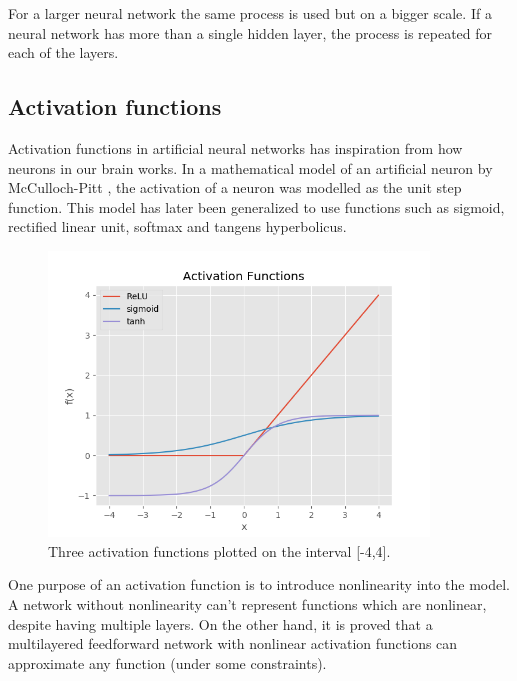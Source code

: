 For a larger neural network the same process is used but on a bigger scale. If a neural network has more than a single hidden layer, the process is repeated for each of the layers.




\subsection{Activation functions} %
\label{activation_functions}

Activation functions in artificial neural networks has inspiration from how neurons in our brain works. In a mathematical model of an artificial neuron by McCulloch-Pitt \cite{mcculloch_logical_1943}, the activation of a neuron was modelled as the unit step function. This model has later been generalized to use functions such as sigmoid, rectified linear unit, softmax and tangens hyperbolicus. \parencite{jain_artificial_1996}

\begin{figure}[H]
  \centering
    \includegraphics[width=0.9\textwidth]{Assets/Chapter2_Theory/activation_function_overview.png}
    \caption{Three activation functions plotted on the interval [-4,4].}
\end{figure}

One purpose of an activation function is to introduce nonlinearity into the model. A network without nonlinearity can't represent functions which are nonlinear, despite having multiple layers. On the other hand, it is proved that a multilayered feedforward network with nonlinear activation functions can approximate any function (under some constraints). \cite{leshno_multilayer_1993}

